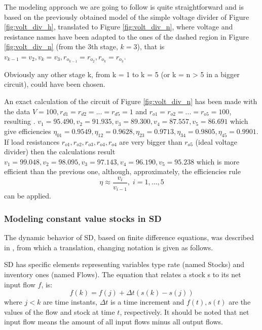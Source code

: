 \documentclass[11pt, a4paper]{article}
\theoremstyle{definition}
\theoremstyle{plain}
\theoremstyle{plain}
\theoremstyle{remark}
\theoremstyle{remark}
\theoremstyle{remark}
\begin{document}
{	The modeling approach we are going to follow is quite straightforward and is based on the previously obtained model of the simple voltage divider of Figure \ref{fig:volt_div_h}, translated to Figure \ref{fig:volt_div_n}, where voltage and resistance names have been adapted to the ones of the dashed
	region in Figure \ref{fig:volt_div_n} (from the 3th stage, $ k = 3 $), that is $ v_{k-1} = v_2 , v_k = v_3 , r_{o_{k-1}} = r_{o_2} , r_{o_k} = r_{o_3}  $. 
	
	Obviously any other stage k, from k = 1 to k = 5 (or k = n > 5 in a bigger circuit), could have been chosen.
	
	An exact calculation of the circuit of Figure \ref{fig:volt_div_n} has been made with the data $ V = 100, r_{d1} = r_{d2} = . . . = r_{d5} = 1$ and $r_{o1} = r_{o2} = . . . = r_{o5} = 100 $, resulting .
	$ v_1 = 95.490, v_2 = 91.935, v_3 = 89.300, v_4 = 87.557, v_5 = 86.691 $
	which give efficiencies 
	$\eta_{01} = 0.9549, \eta_{12} = 0.9628, \eta_{23} = 0.9713, \eta_{34} = 0.9805, \eta_{45} = 0.9901$.\\
	
	If load resistances $ r_{o1} , r_{o2} , r_{o3} , r_{o4} , r_{o4} $ are very bigger than $ r_{o5} $ (ideal voltage divider) then the calculations result
	$ v_1 = 99.048, v_2 = 98.095, v_3 = 97.143, v_4 = 96.190, v_5 = 95.238 $
	which is more efficient than the previous one, although, approximately, the efficiencies rule
	\[
	\eta \approx \frac{v_i}{v_{i-1}}, \; i=1,\ldots,5
	\]
	can be applied.
	
	
	
	\subsubsection{Modeling constant value stocks in SD}
	
	The dynamic behavior of SD, based on finite difference equations, was described in \cite[p.76]{Forrester1961}, from which a translation, changing notation is given as follows.
	
	SD has specific elements representing variables type rate (named Stocks) and inventory ones (named Flows). The equation that relates a stock s to its net input flow $ f $, is:
	\begin{equation}
		f (k) = f (j) + \Delta t(s(k) - s(j))
		\label{eq:3}
	\end{equation}
	where $ j < k $ are time instants, $ \Delta t $ is a time increment and $f(t), s(t)$ are the values of the flow and stock at time $ t $, respectively. It should be noted that net input flow means the
	amount of all input flows minus all output flows.
	
}
\end{document}
